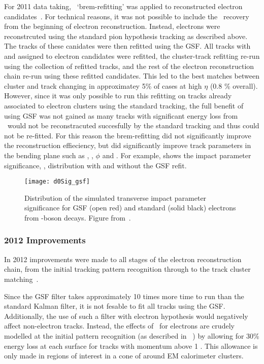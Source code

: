 For 2011 data taking, \brem\ `brem-refitting' was applied to
reconstructed electron candidates~\cite{ATLAS-CONF-2012-047}. For technical reasons, it was not possible to
include the \brem\ recovery from the beginning of electron reconstruction.
Instead, electrons were reconstrcuted using the standard pion hypothesis
tracking as described above. The tracks of these canidates were then refitted
using the GSF. All tracks with  and  assigned to
electron candidates were refitted, the cluster-track refitting re-run
using the collection of refitted tracks, and the rest of the electron reconstruction
chain re-run using these refitted candidates. This led to the best matches between
cluster and track changing in approximatey 5\% of cases at high $\eta$ (0.8 \%
overall). However, since it was only possible to run this refitting on tracks
already associated to electron clusters using the standard tracking, the full
benefit of using GSF was not gained as many tracks with significant energy loss
from \brem\ would not be reconstracuted succesfully by the standard tracking and
thus could not be re-fitted. For this reason the brem-refitting did not
significantly improve the reconstruction effieciency, but did significantly
improve track parameters in the bending plane such as \dzero, \dzerosig,
$\phi$ and \qoverp. For example,  shows the impact parameter
significance, \dzerosig, distribution with and without the GSF refit. 

\begin{figure}[h]
\centering
            \texttt{[image: d0Sig\_gsf]}
\caption{
Distribution of the simulated transverse impact parameter significance for GSF (open
red) and standard (solid black) electrons from \Z-boson decays. 
Figure from~\cite{ATLAS-CONF-2012-047}.}
\label{fig:d0Sig-gsf}
\end{figure}

\subsubsection{2012 Improvements}

In 2012 improvements were made to all stages of the electron reconstruction
chain, from the initial tracking pattern recognition through to the track
cluster matching~\cite{HSG2:1456228}. 

Since the GSF filter takes approximately 10 times more time to
run than the standard Kalman filter, it is not fesable to fit all tracks using
the GSF. Additionally, the use of such a filter with electron hypothesis would
negatively affect non-electron tracks. Instead, the effects of \brem\ for
electrons are crudely modelled at the initial pattern recognition (as described
in ~) by allowing for 30\% energy loss at each surface for tracks with
momentum above 1 \gev. This allowance is only made in regions of interest in a
cone of  around EM calorimeter clusters. 

